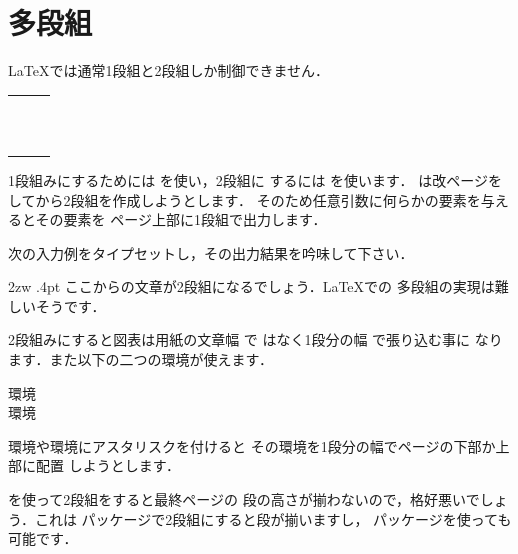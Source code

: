 \section{多段組}
{\LaTeX}では通常1段組と2段組しか制御できません．%
%
\begin{Syntax}
\begin{tabular}{ll}
 \Cmd{onecolumn}           & \\
 \Cmd{twocolumn}\opa{要素} & \\
 \Cmd{columnsep}　         & \pp{2段組のときの段間}\\
 \Cmd{columnseprule}　     & \pp{2段組のときの段間に引く罫線の太さ}
\end{tabular}
\end{Syntax}
1段組みにするためには を使い，2段組に
するには を使います．
は改ページをしてから2段組を作成しようとします．
そのため任意引数に何らかの要素を与えるとその要素を
ページ上部に1段組で出力します．

\begin{Exe}
次の入力例をタイプセットし，その出力結果を吟味して下さい．

\begin{InTeX}
\columnsep 2zw
\columnseprule .4pt
ここからの文章が2段組になるでしょう．{\LaTeX}での
多段組の実現は難しいそうです．
\end{InTeX}

\end{Exe}

2段組みにすると図表は用紙の文章幅 で
はなく1段分の幅 で張り込む事に
なります．また以下の二つの環境が使えます．
\begin{Syntax}
 環境 \\
 環境
\end{Syntax}
環境や環境にアスタリスクを付けると
その環境を1段分の幅でページの下部か上部に配置
しようとします．

を使って2段組をすると最終ページの
段の高さが揃わないので，格好悪いでしょう．これは
パッケージで2段組にすると段が揃いますし，
パッケージを使っても可能です．


